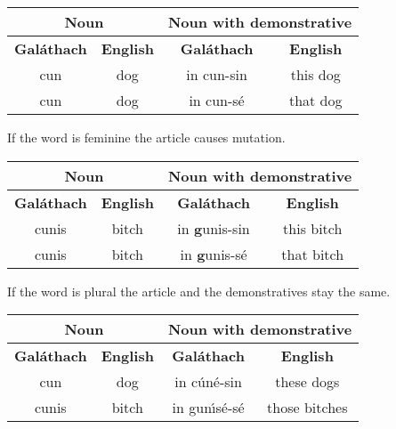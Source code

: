 \begin{table}[H]
\centering
\begin{tabular}{cccc}
  \toprule
  \multicolumn{2}{c}{\textbf{Noun}} & \multicolumn{2}{c}{\textbf{Noun with demonstrative}}\\
  \midrule
  \textbf{Gal\'{a}thach} & \textbf{English} & \textbf{Gal\'{a}thach} & \textbf{English}\\
  \cmidrule(lr){1-1}\cmidrule(lr){2-2}\cmidrule(lr){3-3}\cmidrule(lr){4-4}
  cun & dog & in cun-sin & this dog\\
  cun & dog &  in cun-s\'{e} & that dog\\
  \bottomrule
\end{tabular}
\label{examples_demonstrative}
\end{table}

If the word is feminine the article causes mutation.
\begin{table}[H]
\centering
\begin{tabular}{cccc}
  \toprule
  \multicolumn{2}{c}{\textbf{Noun}} & \multicolumn{2}{c}{\textbf{Noun with demonstrative}}\\
  \midrule
  \textbf{Gal\'{a}thach} & \textbf{English} & \textbf{Gal\'{a}thach} & \textbf{English}\\
  \cmidrule(lr){1-1}\cmidrule(lr){2-2}\cmidrule(lr){3-3}\cmidrule(lr){4-4}
  cunis & bitch & in \textbf{g}unis-sin & this bitch\\
  cunis & bitch & in \textbf{g}unis-s\'{e} & that bitch\\
  \bottomrule
\end{tabular}
\label{examples_demonstrative_mutation}
\end{table}

If the word is plural the article and the demonstratives stay the same.
\begin{table}[H]
\centering
\begin{tabular}{cccc}
  \toprule
  \multicolumn{2}{c}{\textbf{Noun}} & \multicolumn{2}{c}{\textbf{Noun with demonstrative}}\\
  \midrule
  \textbf{Gal\'{a}thach} & \textbf{English} & \textbf{Gal\'{a}thach} & \textbf{English}\\
  \cmidrule(lr){1-1}\cmidrule(lr){2-2}\cmidrule(lr){3-3}\cmidrule(lr){4-4}
  cun & dog & in c\'{u}n\'{e}-sin & these dogs\\
  cunis & bitch & in gun\'{\i}s\'{e}-s\'{e} & those bitches\\
  \bottomrule
\end{tabular}
\label{examples_demonstrative_plural}
\end{table}

